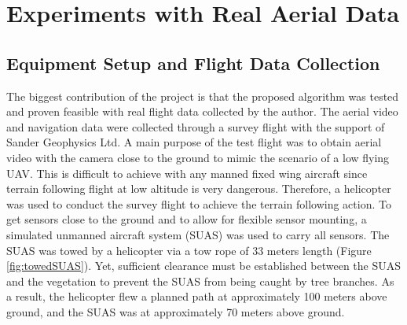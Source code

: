 \chapter{Experiments with Real Aerial Data}
\section{Equipment Setup and Flight Data Collection}
The biggest contribution of the project is that the proposed algorithm
was tested and proven feasible with real flight data collected by the
author. The aerial video and navigation data were collected through a
survey flight with the support of Sander Geophysics Ltd. A main
purpose of the test flight was to obtain aerial video with the camera
close to the ground to mimic the scenario of a low flying UAV. This is
difficult to achieve with any manned fixed wing aircraft since terrain
following flight at low altitude is very dangerous. Therefore, a
helicopter was used to conduct the survey flight to achieve the
terrain following action. To get sensors close to the ground and to
allow for flexible sensor mounting, a simulated unmanned aircraft
system (SUAS) was used to carry all sensors. The SUAS was towed by a
helicopter via a tow rope of 33 meters length (Figure
\ref{fig:towedSUAS}). Yet, sufficient clearance must be established
between the SUAS and the vegetation to prevent the SUAS from being
caught by tree branches. As a result, the helicopter flew a planned
path at approximately 100 meters above ground, and the SUAS was at
approximately 70 meters above ground.


